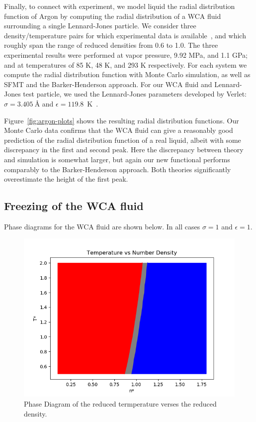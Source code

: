 \documentclass[letterpaper,twocolumn,amsmath,amssymb,prb]{revtex4-1}
\begin{document}
Finally, to connect with experiment, we model liquid the radial
distribution function of Argon by computing the radial distribution of
a WCA fluid surrounding a single Lennard-Jones particle.  We consider
three density/temperature pairs for which experimental data is
available~\cite{mikolaj2004structure, eggert2002quantitative,
yarnell1973structure}, and which roughly span the range of reduced
densities from 0.6 to 1.0. The three experimental results were
performed at vapor pressure, 9.92 MPa, and 1.1 GPa; and at
temperatures of 85 K, 48 K, and 293 K respectively. For each system we
compute the radial distribution function with Monte Carlo simulation,
as well as SFMT and the Barker-Henderson approach.  For our WCA fluid
and Lennard-Jones test particle, we used the Lennard-Jones parameters
developed by Verlet: $\sigma = 3.405 ~\textrm{\AA}$ and $\epsilon =
119.8$~K~\cite{verlet1967computer}.

Figure~\ref{fig:argon-plots} shows the resulting radial distribution
functions.  Our Monte Carlo data confirms that the WCA fluid can give
a reasonably good prediction of the radial distribution function of a
real liquid, albeit with some discrepancy in the first and second
peak.  Here the discrepancy between theory and simulation is somewhat
larger, but again our new functional performs comparably to the
Barker-Henderson approach.  Both theories significantly overestimate
the height of the first peak.




\subsection{Freezing of the WCA fluid}

Phase diagrams for the WCA fluid are shown below. In all cases $\sigma=1$ and $\epsilon=1$.

\begin{figure}
 \begin{center}
  \includegraphics[width=\columnwidth]{figs/Phase_Diagram_of_T_vs_n}
 \end{center}
\caption{Phase Diagram of the reduced termperature verses the reduced density.}
\label{fig:Phase_Diagram_of_T_vs_n}
\end{figure}
\end{document}
